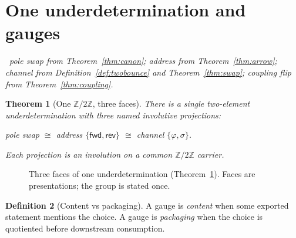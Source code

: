 \documentclass[11pt,a4paper]{article}
\theoremstyle{plain}
\newtheorem{theorem}{Theorem}[section]
\theoremstyle{definition}
\newtheorem{definition}[theorem]{Definition}
\theoremstyle{remark}
\newcommand{\Ztwo}{\mathbb{Z}/2\mathbb{Z}}
\newcommand{\dep}[1]{%
  \par\noindent{\small\color{muted}\sffamily Dependence:}~\textit{#1}\par\medskip}
\begin{document}
\Needspace{18em}
\section{One underdetermination and gauges}
\label{sec:z2}

\dep{pole swap from Theorem~\ref{thm:canon}; address from
Theorem~\ref{thm:arrow}; channel from Definition~\ref{def:twobounce} and
Theorem~\ref{thm:swap}; coupling flip from Theorem~\ref{thm:coupling}.}

\begin{theorem}[One $\Ztwo$, three faces]
\label{thm:z2}
There is a single two-element underdetermination with three named
involutive projections:
\begin{center}
pole swap \quad$\cong$\quad
address $\{\mathsf{fwd},\mathsf{rev}\}$ \quad$\cong$\quad
channel $\{\varphi,\sigma\}$.
\end{center}
Each projection is an involution on a common $\Ztwo$ carrier.
\end{theorem}

\begin{figure}[ht]
\centering
{}
\caption{Three faces of one underdetermination (Theorem~\ref{thm:z2}).
Faces are presentations; the group is stated once.}
\label{fig:z2}
\end{figure}

\begin{definition}[Content vs packaging]
\label{def:gauge}
A gauge is \emph{content} when some exported statement mentions the
choice. A gauge is \emph{packaging} when the choice is quotiented before
downstream consumption.
\end{definition}
\end{document}
